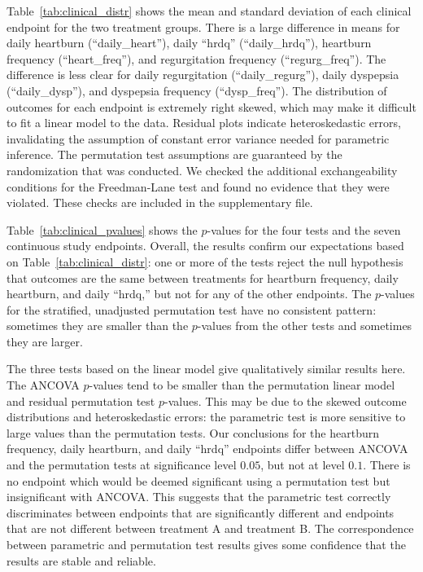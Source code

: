 \documentclass[12pt]{article}
\begin{document}
Table~\ref{tab:clinical_distr} shows the mean and standard deviation of each clinical endpoint for the two treatment groups.
There is a large difference in means for daily heartburn (``daily\_heart''), daily ``hrdq'' (``daily\_hrdq''), heartburn frequency (``heart\_freq''), and regurgitation frequency (``regurg\_freq'').
The difference is less clear for daily regurgitation (``daily\_regurg''), daily dyspepsia (``daily\_dysp''), and dyspepsia frequency (``dysp\_freq'').
The distribution of outcomes for each endpoint is extremely right skewed, which may make it difficult to fit a linear model to the data.
Residual plots indicate heteroskedastic errors, invalidating the assumption of constant error variance needed for parametric inference.
The permutation test assumptions are guaranteed by the randomization that was conducted.
We checked the additional exchangeability conditions for the Freedman-Lane test and found no evidence that they were violated. 
These checks are included in the supplementary file.

Table~\ref{tab:clinical_pvalues} shows the $p$-values for the four tests and the seven continuous study endpoints.
Overall, the results confirm our expectations based on Table~\ref{tab:clinical_distr}:
one or more of the tests reject the null hypothesis that outcomes are the same between treatments for heartburn frequency, daily heartburn, and daily ``hrdq,''
but not for any of the other endpoints.
The $p$-values for the stratified, unadjusted permutation test have no consistent pattern: sometimes they are smaller than the $p$-values from the other tests and sometimes they are larger.

The three tests based on the linear model give qualitatively similar results here.
The ANCOVA $p$-values tend to be smaller than the permutation linear model and residual permutation test $p$-values.
This may be due to the skewed outcome distributions and heteroskedastic errors: the parametric test is more sensitive to large values than the permutation tests.
Our conclusions for the heartburn frequency, daily heartburn, and daily ``hrdq'' endpoints differ between ANCOVA and the permutation tests at significance level $0.05$, but not at level $0.1$.
There is no endpoint which would be deemed significant using a permutation test but insignificant with ANCOVA.
This suggests that the parametric test correctly discriminates between endpoints that are significantly different and endpoints that are not different between treatment A and treatment B.
The correspondence between parametric and permutation test results gives some confidence that the results are stable and reliable.
\end{document}
